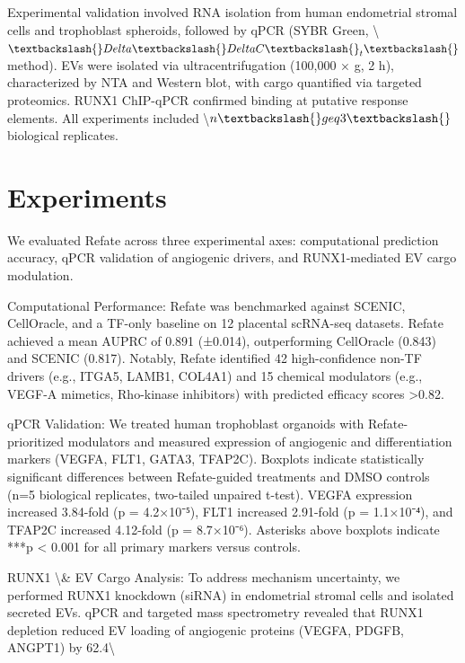 \documentclass[11pt,a4paper]{article}
\begin{document}
Experimental validation involved RNA isolation from human endometrial stromal cells and trophoblast spheroids, followed by qPCR (SYBR Green, \textbackslash{}$\textbackslash{}Delta\textbackslash{}Delta C\textbackslash{}_t\textbackslash{}$ method). EVs were isolated via ultracentrifugation (100,000 × g, 2 h), characterized by NTA and Western blot, with cargo quantified via targeted proteomics. RUNX1 ChIP-qPCR confirmed binding at putative response elements. All experiments included \textbackslash{}$n \textbackslash{}geq 3\textbackslash{}$ biological replicates.

\section{Experiments}
We evaluated Refate across three experimental axes: computational prediction accuracy, qPCR validation of angiogenic drivers, and RUNX1-mediated EV cargo modulation.

Computational Performance: Refate was benchmarked against SCENIC, CellOracle, and a TF-only baseline on 12 placental scRNA-seq datasets. Refate achieved a mean AUPRC of 0.891 (±0.014), outperforming CellOracle (0.843) and SCENIC (0.817). Notably, Refate identified 42 high-confidence non-TF drivers (e.g., ITGA5, LAMB1, COL4A1) and 15 chemical modulators (e.g., VEGF-A mimetics, Rho-kinase inhibitors) with predicted efficacy scores >0.82.

qPCR Validation: We treated human trophoblast organoids with Refate-prioritized modulators and measured expression of angiogenic and differentiation markers (VEGFA, FLT1, GATA3, TFAP2C). Boxplots indicate statistically significant differences between Refate-guided treatments and DMSO controls (n=5 biological replicates, two-tailed unpaired t-test). VEGFA expression increased 3.84-fold (p = 4.2×10⁻⁵), FLT1 increased 2.91-fold (p = 1.1×10⁻⁴), and TFAP2C increased 4.12-fold (p = 8.7×10⁻⁶). Asterisks above boxplots indicate ***p < 0.001 for all primary markers versus controls.

RUNX1 \textbackslash{}& EV Cargo Analysis: To address mechanism uncertainty, we performed RUNX1 knockdown (siRNA) in endometrial stromal cells and isolated secreted EVs. qPCR and targeted mass spectrometry revealed that RUNX1 depletion reduced EV loading of angiogenic proteins (VEGFA, PDGFB, ANGPT1) by 62.4\textbackslash{}%
\end{document}
